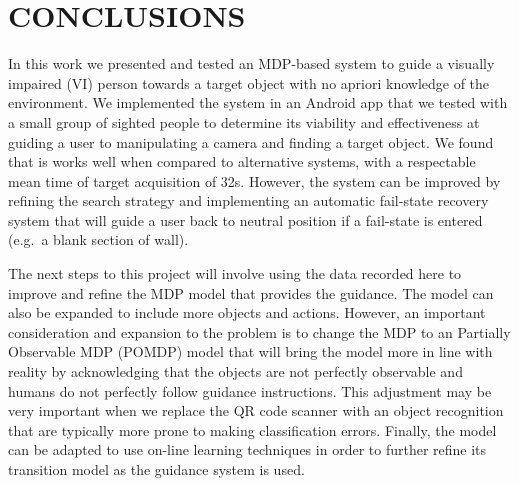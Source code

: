 \documentclass[a4paper, twoside]{article}
\begin{document}
\section{\uppercase{Conclusions}}\label{sec:conclusion}

\noindent In this work we presented and tested an MDP-based system to guide a visually impaired (VI) person towards a target object with no apriori knowledge of the environment. We implemented the system in an Android app that we tested with a small group of sighted people to determine its viability and effectiveness at guiding a user to manipulating a camera and finding a target object. We found that is works well when compared to alternative systems, with a respectable mean time of target acquisition of 32s. However, the system can be improved by refining the search strategy and implementing an automatic fail-state recovery system that will guide a user back to neutral position if a fail-state is entered (e.g.\ a blank section of wall). 

The next steps to this project will involve using the data recorded here to improve and refine the MDP model that provides the guidance. The model can also be expanded to include more objects and actions. However, an important consideration and expansion to the problem is to change the MDP to an Partially Observable MDP (POMDP) model that will bring the model more in line with reality by acknowledging that the objects are not perfectly observable and humans do not perfectly follow guidance instructions. This adjustment may be very important when we replace the QR code scanner with an object recognition that are typically more prone to making classification errors. Finally, the model can be adapted to use on-line learning techniques in order to further refine its transition model as the guidance system is used.  



\end{document}
